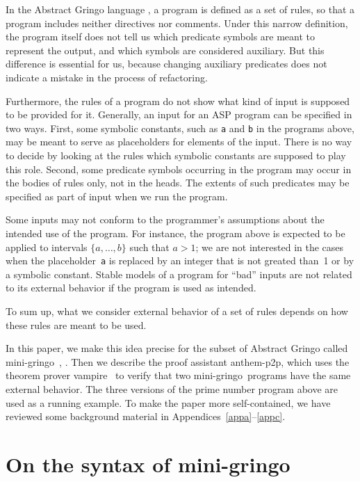 \documentclass{new_tlp}
\def\gringo{{\sc gringo}}
\def\vampire{{\sc vampire}}
\begin{document}
In the Abstract Gringo language \cite{geb15}, a program is defined as
a set of rules, so that a program
includes neither directives nor comments.  Under this narrow definition,
the program itself does not tell us which predicate symbols are meant to
represent the output, and which symbols are considered
auxiliary.  But this difference is essential for us, because changing
auxiliary predicates does not indicate a mistake in the process of
refactoring.

Furthermore, the rules of a program do not show what kind of input is
supposed to be provided for it.
Generally, an input for an ASP program can be specified in two ways.
First, some symbolic constants, such as {\tt a} and {\tt b} in the
programs above, may be meant to serve as placeholders for elements of
the input.
There is no way to decide by looking at the rules
which symbolic constants are supposed to play this role.
Second, some predicate symbols occurring in the program may occur in
the bodies of rules only, not in the heads.  The extents of such
predicates may be specified as part of input when we run the program.

Some inputs may not conform to the programmer's assumptions about
the intended use of the program.  For instance, the program above is
expected to be applied to intervals $\{a,\dots,b\}$ such that $a>1$;
we are not interested in the cases when the placeholder~{\tt a} is
replaced by an integer that is not greated than~1 or by a symbolic constant.
Stable models of a program for ``bad'' inputs are not related to its
external behavior if the program is used as intended.

To sum up, what we consider external behavior of a set of rules
depends on how these rules are meant to be used.

In this paper, we make this idea precise
for the subset of
Abstract Gringo called mini-\gringo\ \cite[Section~2]{fan20},
\cite[Section~2.1]{fan22}.   Then we describe the proof assistant
{\sc anthem-p2p}, which uses
the theorem prover \vampire\ \cite{vor13}
 to verify that two mini-\gringo\ programs have the
 same external behavior.  The three versions of the prime number program
 above are used as a running example.  To make the paper more
 self-contained, we have reviewed some background material in
 Appendices~\ref{appa}--\ref{appc}.

\section{On the syntax of mini-\gringo}\label{sec:mg}
\end{document}
